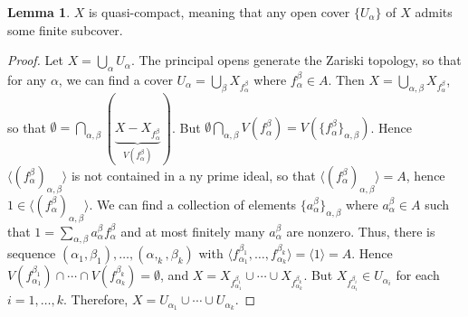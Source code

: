 \documentclass[10pt,letterpaper,cm]{nupset}
\theoremstyle{definition}
\theoremstyle{theorem}
\newtheorem{lemma}[definition]{Lemma}
\theoremstyle{remark}
\newcommand{\1}{\mathbf{1}}
\newcommand{\0}{\vec 0}
\begin{document}
\begin{lemma}
$X$ is quasi-compact, meaning that any open cover $\{U_{\alpha}\}$ of $X$ admits some finite subcover. 
\end{lemma}
\begin{proof}
Let $X = \bigcup_{\alpha} U_{\alpha}$. The principal opens generate the Zariski topology, so that for any $\alpha$, we can find a cover $U_{\alpha} = \bigcup_{\beta} X_{f_{\alpha}^{\beta}}$ where $f_{\alpha}^{\beta}\in A$. Then $X = \bigcup_{\alpha, \beta} X_{f_{\alpha}^{\beta}}$, so that $\emptyset = \bigcap_{\alpha, \beta}(\underbrace{X - X_{f_{\alpha}^{\beta}}}_{V({f_{\alpha}^{\beta}})})$. But $\emptyset \bigcap_{\alpha, \beta} V({f_{\alpha}^{\beta}})= V(\{ {f_{\alpha}^{\beta}} \}_{\alpha, \beta})$. Hence $\langle ({f_{\alpha}^{\beta}})_{\alpha, \beta} \rangle$ is not contained in a ny prime ideal, so that $\langle ({f_{\alpha}^{\beta}})_{\alpha, \beta} \rangle =A$, hence $1\in \langle ({f_{\alpha}^{\beta}})_{\alpha, \beta} \rangle$. We can find a collection of elements $\{a_{\alpha}^{\beta} \}_{\alpha, \beta}$ where $a_{\alpha}^{\beta} \in A$ such that $1= \sum_{\alpha, \beta} a_{\alpha}^{\beta} f_{\alpha}^{\beta}$ and at most finitely many $a_{\alpha}^{\beta}$ are nonzero. Thus, there is sequence $(\alpha_1, \beta_1), \ldots, (\alpha,_k , \beta_k)$ with $\langle f_{\alpha_1}^{\beta_1}, \ldots, f_{\alpha_k}^{\beta_k} \rangle = \langle 1 \rangle = A$. Hence $V(f_{\alpha_1}^{\beta_1}) \cap \cdots \cap V(f_{\alpha_k}^{\beta_k}) = \emptyset$, and $X = X_{f_{\alpha_1}^{\beta_1}} \cup \cdots \cup X_{f_{\alpha_k}^{\beta_k}}$. But $X_{f_{\alpha_i}^{\beta_i}} \in U_{\alpha_i}$ for each $i=1, \ldots, k$. Therefore, $X= U_{\alpha_1} \cup \cdots \cup U_{\alpha_k}$.
\end{proof}
\end{document}
